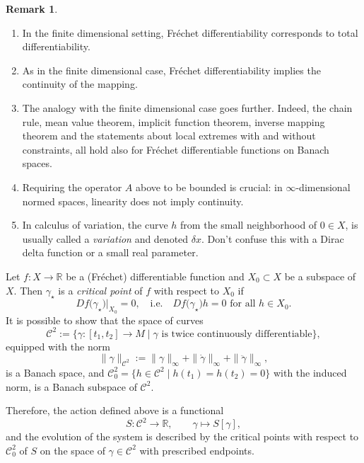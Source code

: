\documentclass[english,fontsize=11pt,paper=b5]{scrbook}
\numberwithin{equation}{chapter}
\theoremstyle{definition}
\newtheorem{remark}{Remark}[chapter]
\newcommand{\emphidx}[1]{\index{#1}\emph{#1}}
\begin{document}
  \begin{remark}
    \begin{enumerate}
      \item In the finite dimensional setting, Fr\'echet differentiability corresponds to total differentiability.
      \item As in the finite dimensional case, Fr\'echet differentiability implies the continuity of the mapping.
      \item The analogy with the finite dimensional case goes further. Indeed, the chain rule, mean value theorem, implicit function theorem, inverse mapping theorem and the statements about local extremes with and without constraints, all hold also for Fr\'echet differentiable functions on Banach spaces.
      \item Requiring the operator $A$ above to be bounded is crucial: in $\infty$-dimensional normed spaces, linearity does not imply continuity.
      \item In calculus of variation, the curve $h$ from the small neighborhood of $0\in X$, is usually called a \emphidx{variation} and denoted $\delta x$. Don't confuse this with a Dirac delta function or a small real parameter.
    \end{enumerate}
  \end{remark}

  Let $f: X \to \mathbb{R}$ be a (Fr\'echet) differentiable function and $X_0 \subset X$ be a subspace of $X$. Then $\gamma_\star$ is a \emph{critical point}  of $f$ with respect to $X_0$ if
  \begin{equation}
    Df\big(\gamma_\star\big)\Big|_{X_0} = 0, \quad\mbox{i.e.}\quad
    Df\big(\gamma_\star\big)h = 0 \mbox{ for all } h\in X_0.
  \end{equation}
  It is possible to show that the space of curves
  \begin{equation}
    \mathcal{C}^2 := \big\{ \gamma: [t_1, t_2] \to M \mid \gamma \mbox{ is twice continuously differentiable}\big\},
  \end{equation} equipped with the norm
  \begin{equation}
    \|\gamma\|_{\mathcal{C}^2} :=
    \|\gamma\|_\infty + \|\dot \gamma\|_\infty + \|\ddot \gamma\|_\infty,
  \end{equation}
  is a Banach space, and $\mathcal{C}^2_0 = \big\{h\in \mathcal{C}^2 \mid h(t_1) = h(t_2) = 0\big\}$ with the induced norm, is a Banach subspace of $\mathcal{C}^2$.

  Therefore, the action defined above is a functional
  \begin{equation}
    S : \mathcal{C}^2 \to \mathbb{R},\qquad \gamma \mapsto S[\gamma],
  \end{equation}
  and the evolution of the system is described by the critical points with respect to $\mathcal{C}^2_0$ of $S$ on the space of $\gamma \in \mathcal{C}^2$ with prescribed endpoints.
\end{document}
